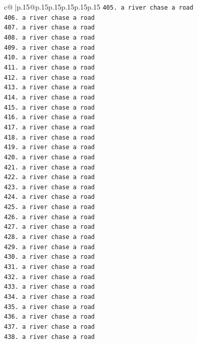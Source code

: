 \documentclass{article}
\begin{document}
{\begin{supertabular}{c@{$\;$}|p{.15\linewidth}@{}p{.15\linewidth}p{.15\linewidth}p{.15\linewidth}p{.15\linewidth}p{.15\linewidth}}
{{{\texttt{405. a river chase a road} \\
\texttt{406. a river chase a road} \\
\texttt{407. a river chase a road} \\
\texttt{408. a river chase a road} \\
\texttt{409. a river chase a road} \\
\texttt{410. a river chase a road} \\
\texttt{411. a river chase a road} \\
\texttt{412. a river chase a road} \\
\texttt{413. a river chase a road} \\
\texttt{414. a river chase a road} \\
\texttt{415. a river chase a road} \\
\texttt{416. a river chase a road} \\
\texttt{417. a river chase a road} \\
\texttt{418. a river chase a road} \\
\texttt{419. a river chase a road} \\
\texttt{420. a river chase a road} \\
\texttt{421. a river chase a road} \\
\texttt{422. a river chase a road} \\
\texttt{423. a river chase a road} \\
\texttt{424. a river chase a road} \\
\texttt{425. a river chase a road} \\
\texttt{426. a river chase a road} \\
\texttt{427. a river chase a road} \\
\texttt{428. a river chase a road} \\
\texttt{429. a river chase a road} \\
\texttt{430. a river chase a road} \\
\texttt{431. a river chase a road} \\
\texttt{432. a river chase a road} \\
\texttt{433. a river chase a road} \\
\texttt{434. a river chase a road} \\
\texttt{435. a river chase a road} \\
\texttt{436. a river chase a road} \\
\texttt{437. a river chase a road} \\
\texttt{438. a river chase a road} \\
}}}
\end{supertabular}}
\end{document}
